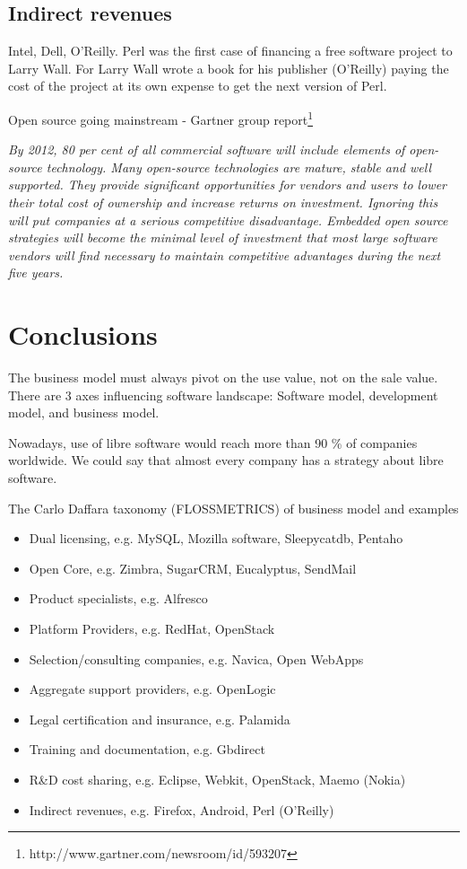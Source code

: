 \subsection{Indirect revenues}

Intel, Dell, O'Reilly. Perl was the first case of financing a free software
 project to Larry Wall. For Larry Wall wrote a book for his publisher (O'Reilly)
  paying the cost of the project at its own expense to get 
  the next version of Perl.


Open source going mainstream - Gartner group 
report\footnote{http://www.gartner.com/newsroom/id/593207}

\emph{By 2012, 80 per cent of all commercial software will include elements of
 open-source technology. Many open-source technologies are mature, stable and
  well supported. They provide significant opportunities for vendors and users
   to lower their total cost of ownership and increase returns on investment. 
   Ignoring this will put companies at a serious competitive disadvantage. 
   Embedded open source strategies will become the minimal level of investment
    that most large software vendors will find necessary to maintain
     competitive advantages during the next five years.}

\section{Conclusions}\label{conclusions}

The business model must always pivot on the use value, not on the sale value.
\\

There are 3 axes influencing  software landscape: Software model, development model, and  business model.

Nowadays, use of libre software would reach more than 90 \% of companies worldwide. We could say that almost every company has a strategy about libre software.

The  Carlo Daffara taxonomy (FLOSSMETRICS) of business model and examples
\begin{itemize}
    \item         Dual licensing, e.g. MySQL, Mozilla software, Sleepycatdb, Pentaho
    \item         Open Core, e.g. Zimbra, SugarCRM, Eucalyptus, SendMail
     \item        Product specialists, e.g. Alfresco
    \item        Platform Providers, e.g. RedHat, OpenStack
     \item        Selection/consulting companies, e.g. Navica, Open WebApps
     \item        Aggregate support providers, e.g. OpenLogic
     \item        Legal certification and insurance, e.g. Palamida
    \item         Training and documentation, e.g. Gbdirect
     \item        R\&D cost sharing, e.g. Eclipse, Webkit, OpenStack, Maemo (Nokia)
     \item        Indirect revenues, e.g. Firefox, Android, Perl (O'Reilly)
\end{itemize}


